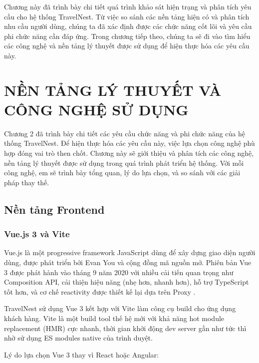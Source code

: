\documentclass[13pt,a4paper,twoside]{report}
\begin{document}
Chương này đã trình bày chi tiết quá trình khảo sát hiện trạng và phân tích yêu cầu cho hệ thống TravelNest. Từ việc so sánh các nền tảng hiện có và phân tích nhu cầu người dùng, chúng ta đã xác định được các chức năng cốt lõi và yêu cầu phi chức năng cần đáp ứng. Trong chương tiếp theo, chúng ta sẽ đi vào tìm hiểu các công nghệ và nền tảng lý thuyết được sử dụng để hiện thực hóa các yêu cầu này.


\chapter{NỀN TẢNG LÝ THUYẾT VÀ CÔNG NGHỆ SỬ DỤNG}

Chương 2 đã trình bày chi tiết các yêu cầu chức năng và phi chức năng của hệ thống TravelNest. Để hiện thực hóa các yêu cầu này, việc lựa chọn công nghệ phù hợp đóng vai trò then chốt. Chương này sẽ giới thiệu và phân tích các công nghệ, nền tảng lý thuyết được sử dụng trong quá trình phát triển hệ thống. Với mỗi công nghệ, em sẽ trình bày tổng quan, lý do lựa chọn, và so sánh với các giải pháp thay thế.

\section{Nền tảng Frontend}

\subsection{Vue.js 3 và Vite}

Vue.js là một progressive framework JavaScript dùng để xây dựng giao diện người dùng, được phát triển bởi Evan You và cộng đồng mã nguồn mở. Phiên bản Vue 3 được phát hành vào tháng 9 năm 2020 với nhiều cải tiến quan trọng như Composition API, cải thiện hiệu năng (nhẹ hơn, nhanh hơn), hỗ trợ TypeScript tốt hơn, và cơ chế reactivity được thiết kế lại dựa trên Proxy \cite{vue3docs}.

TravelNest sử dụng Vue 3 kết hợp với Vite làm công cụ build cho ứng dụng khách hàng. Vite là một build tool thế hệ mới với khả năng hot module replacement (HMR) cực nhanh, thời gian khởi động dev server gần như tức thì nhờ sử dụng ES modules native của trình duyệt.

Lý do lựa chọn Vue 3 thay vì React hoặc Angular:
\end{document}
